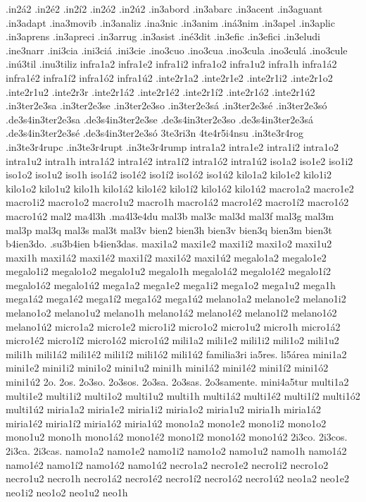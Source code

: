 {.in2á2 .in2é2 .in2í2 .in2ó2 .in2ú2
.in3abord
.in3abarc
.in3acent
.in3aguant
.in3adapt
.ina3movib
.in3analiz
.ina3nic
.in3anim
.iná3nim
.in3apel
.in3aplic
.in3aprens
.in3apreci
.in3arrug
.in3asist
.iné3dit
.in3efic
.in3efici
.in3eludi
.ine3narr
.ini3cia .ini3ciá .ini3cie
.ino3cuo .ino3cua
.ino3cula .ino3culá .ino3cule
.inú3til
.inu3tiliz
infra1a2 infra1e2 infra1i2 infra1o2 infra1u2 infra1h
infra1á2 infra1é2 infra1í2 infra1ó2 infra1ú2
.inte2r1a2 .inte2r1e2 .inte2r1i2 .inte2r1o2 .inte2r1u2 .inte2r3r
.inte2r1á2 .inte2r1é2 .inte2r1í2 .inte2r1ó2 .inte2r1ú2
.in3ter2e3sa .in3ter2e3se .in3ter2e3so
.in3ter2e3sá .in3ter2e3sé .in3ter2e3só
.de3s4in3ter2e3sa .de3s4in3ter2e3se .de3s4in3ter2e3so
.de3s4in3ter2e3sá .de3s4in3ter2e3sé .de3s4in3ter2e3só
3te3ri3n 4te4r5i4nsu
.in3te3r4rog
.in3te3r4rupc .in3te3r4rupt .in3te3r4rump
intra1a2 intra1e2 intra1i2 intra1o2 intra1u2 intra1h
intra1á2 intra1é2 intra1í2 intra1ó2 intra1ú2
iso1a2 iso1e2 iso1i2 iso1o2 iso1u2 iso1h
iso1á2 iso1é2 iso1í2 iso1ó2 iso1ú2
kilo1a2 kilo1e2 kilo1i2 kilo1o2 kilo1u2 kilo1h
kilo1á2 kilo1é2 kilo1í2 kilo1ó2 kilo1ú2
macro1a2 macro1e2 macro1i2 macro1o2 macro1u2 macro1h
macro1á2 macro1é2 macro1í2 macro1ó2 macro1ú2
mal2 ma4l3h .ma4l3e4du mal3b mal3c mal3d mal3f mal3g
mal3m mal3p mal3q mal3s mal3t mal3v
bien2 bien3h bien3v bien3q bien3m bien3t
b4ien3do. .su3b4ien b4ien3das.
maxi1a2 maxi1e2 maxi1i2 maxi1o2 maxi1u2 maxi1h
maxi1á2 maxi1é2 maxi1í2 maxi1ó2 maxi1ú2
megalo1a2 megalo1e2 megalo1i2 megalo1o2 megalo1u2 megalo1h
megalo1á2 megalo1é2 megalo1í2 megalo1ó2 megalo1ú2
mega1a2 mega1e2 mega1i2 mega1o2 mega1u2 mega1h
mega1á2 mega1é2 mega1í2 mega1ó2 mega1ú2
melano1a2 melano1e2 melano1i2 melano1o2 melano1u2 melano1h
melano1á2 melano1é2 melano1í2 melano1ó2 melano1ú2
micro1a2 micro1e2 micro1i2 micro1o2 micro1u2 micro1h
micro1á2 micro1é2 micro1í2 micro1ó2 micro1ú2
mili1a2 mili1e2 mili1i2 mili1o2 mili1u2 mili1h
mili1á2 mili1é2 mili1í2 mili1ó2 mili1ú2
familia3ri ia5res.
li5área
mini1a2 mini1e2 mini1i2 mini1o2 mini1u2 mini1h
mini1á2 mini1é2 mini1í2 mini1ó2 mini1ú2
2o. 2os. 2o3so. 2o3sos. 2o3sa. 2o3sas. 2o3samente.
mini4a5tur
multi1a2 multi1e2 multi1i2 multi1o2 multi1u2 multi1h
multi1á2 multi1é2 multi1í2 multi1ó2 multi1ú2
miria1a2 miria1e2 miria1i2 miria1o2 miria1u2 miria1h
miria1á2 miria1é2 miria1í2 miria1ó2 miria1ú2
mono1a2 mono1e2 mono1i2 mono1o2 mono1u2 mono1h
mono1á2 mono1é2 mono1í2 mono1ó2 mono1ú2
2i3co. 2i3cos. 2i3ca. 2i3cas.
namo1a2 namo1e2 namo1i2 namo1o2 namo1u2 namo1h
namo1á2 namo1é2 namo1í2 namo1ó2 namo1ú2
necro1a2 necro1e2 necro1i2 necro1o2 necro1u2 necro1h
necro1á2 necro1é2 necro1í2 necro1ó2 necro1ú2
neo1a2 neo1e2 neo1i2 neo1o2 neo1u2 neo1h
}
